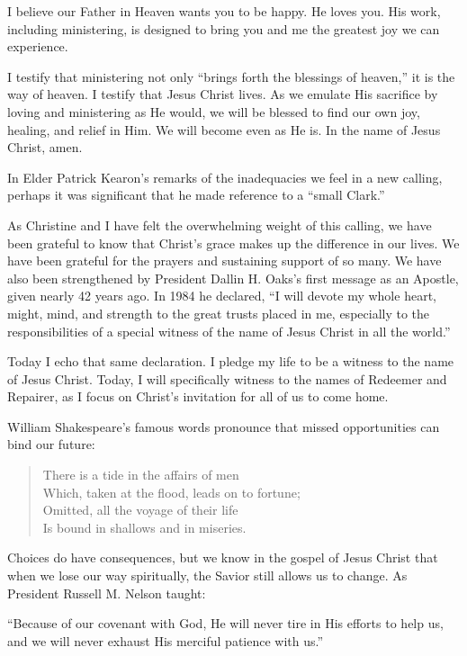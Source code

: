 \documentclass[letterpaper, 11pt]{report}
\newcommand{\speaker}{}
\newcommand{\talk}{}
\newcommand{\talkdatestr}{}
\newcommand{\setspeaker}[1]{\renewcommand{\speaker}{#1}}
\newcommand{\settalk}[1]{\renewcommand{\talk}{#1}}
\newcommand{\talkheading}[2]{%
    \vspace{1em}
    \noindent{\huge\bfseries #1}
    \par\nopagebreak\vspace{0.25em}
    \noindent{\normalsize\bfseries #2\ifx\talkdatestr\empty\else,\ \talkdatestr\fi}
    \par\nopagebreak\vspace{0.5em}
}
\begin{document}
I believe our Father in Heaven wants you to be happy. He loves you. His work, including ministering, is designed to bring you and me the greatest joy we can experience.

I testify that ministering not only “brings forth the blessings of heaven,” it is the way of heaven. I testify that Jesus Christ lives. As we emulate His sacrifice by loving and ministering as He would, we will be blessed to find our own joy, healing, and relief in Him. We will become even as He is. In the name of Jesus Christ, amen.

\newpage
\settalk{Come Home}
\setspeaker{Clark G. Gilbert}
\talkheading{Come Home}{Clark G. Gilbert}

In Elder Patrick Kearon’s remarks of the inadequacies we feel in a new calling, perhaps it was significant that he made reference to a “small Clark.”

As Christine and I have felt the overwhelming weight of this calling, we have been grateful to know that Christ’s grace makes up the difference in our lives. We have been grateful for the prayers and sustaining support of so many. We have also been strengthened by President Dallin H. Oaks’s first message as an Apostle, given nearly 42 years ago. In 1984 he declared, “I will devote my whole heart, might, mind, and strength to the great trusts placed in me, especially to the responsibilities of a special witness of the name of Jesus Christ in all the world.”

Today I echo that same declaration. I pledge my life to be a witness to the name of Jesus Christ. Today, I will specifically witness to the names of Redeemer and Repairer, as I focus on Christ’s invitation for all of us to come home.

William Shakespeare’s famous words pronounce that missed opportunities can bind our future:

\begin{verse}
There is a tide in the affairs of men\\
Which, taken at the flood, leads on to fortune;\\
Omitted, all the voyage of their life\\
Is bound in shallows and in miseries.
\end{verse}

Choices do have consequences, but we know in the gospel of Jesus Christ that when we lose our way spiritually, the Savior still allows us to change. As President Russell M. Nelson taught:

“Because of our covenant with God, He will never tire in His efforts to help us, and we will never exhaust His merciful patience with us.”
\end{document}
